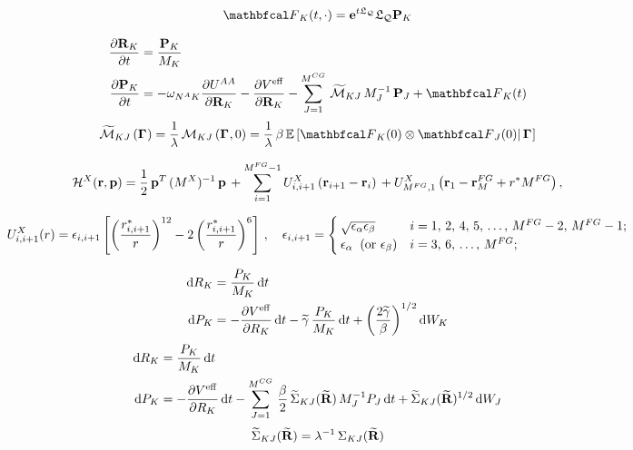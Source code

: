 \documentclass[10pt,a4paper]{book}
\theoremstyle{definition}
\begin{document}
\begin{equation*}
 \fprojbf_{K}(t,\cdot) = \exp{t\Lio_\qproj}\Lio_\qproj\bfP_K
\end{equation*}


\begin{align*}
 \pard{\bfR_{K}}{t} &= \frac{\bfP_{K}}{M_{K}} \\
 \pard{\bfP_{K}}{t} &= -\omega_{\NA{} K} \pard{\pot^{AA}}{\bfR_{K}} - \pard{\Veff}{\bfR_{K}} 
 - \sum_{J=1}^{\ncg}\,\widetilde{\fricmat}_{KJ}\,M_J^{-1}\,\bfP_J + \fprojbf_{K}(t) 
\end{align*}
\begin{equation*}
 \widetilde{\fricmat}_{KJ}\cip{\Bphase{}} = \frac{1}{\lambda}\,\fricmat_{KJ}\cip{\Bphase{},0} = 
 \frac{1}{\lambda}\,\beta\, \cexpval{ \fprojbf_{K}(0) \otimes \fprojbf_{J}(0) }{ \,\Bphase{}}
\end{equation*}






\begin{equation*}
  \mathcal{H}^X(\mathbf{r},\mathbf{p}) = \frac12 \, \mathbf{p}^T\,(M^X)^{-1}\,\mathbf{p}\,+\sum_{i=1}^{M^{FG}-1}U^X_{i,i+1}\left(\mathbf{r}_{i+1}-\mathbf{r}_i\right)\,+ U^X_{M^{FG},1}\left(\mathbf{r}_1-\mathbf{r}_M^{FG}+r^*M^{FG}\right),
\end{equation*}

\begin{equation*}
  	U^X_{i,i+1}(r) = \epsilon_{i,i+1} \left[\left(\frac{r^*_{i,i+1}}{r}\right)^{12} - 2\left(\frac{r^*_{i,i+1}}{r}\right)^6\right]\,, 
	\quad
	\epsilon_{i,i+1} = \begin{cases}
    \sqrt{\epsilon_\alpha\epsilon_\beta} & i = 1,\, 2,\, 4,\, 5,\, \dots,\, M^{FG}-2,\, M^{FG}-1; \\
    \epsilon_\alpha\;\;(\mbox{or}\,\,\epsilon_\beta) & i = 3,\, 6,\, \dots,\, M^{FG};
  \end{cases}
\end{equation*}


\begin{align*}
 \mbox{d} R_{K} &= \frac{P_{K}}{M_{K}} \,\mbox{d} t \\
 \mbox{d} P_{K} &= - \frac{\partial V^{\mathrm{eff}}}{\partial R_{K}} \,\mbox{d} t
                    - \widetilde{\gamma}\, \frac{P_{K}}{M_{K}} \,\mbox{d} t
                    +\left(\frac{2\widetilde{\gamma}}{\beta}\right)^{1/2} \mbox{d} W_K
\end{align*}
\begin{align*}
 \mbox{d} R_{K} &= \frac{P_{K}}{M_{K}} \,\mbox{d} t \\
 \mbox{d} P_{K} &= - \frac{\partial V^{\mathrm{eff}}}{\partial R_{K}} \,\mbox{d} t
                       - \sum_{J=1}^{M^{CG}}\, \frac{\beta}{2}\, \widetilde{\Sigma}_{KJ}(\widetilde{\mathbf{R}}) \,M_J^{-1}P_J \,\mbox{d} t
                       + \widetilde{\Sigma}_{KJ}(\widetilde{\mathbf{R}})^{1/2} \,\mbox{d} W_J
\end{align*}
\begin{equation*}
\widetilde{\Sigma}_{KJ}(\widetilde{\mathbf{R}})=\lambda^{-1}\, \Sigma_{KJ}(\widetilde{\mathbf{R}})
\end{equation*}
\end{document}
